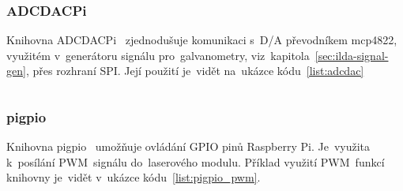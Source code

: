 \subsubsection{ADCDACPi}
Knihovna ADCDACPi~\cite{ADCDACPi} zjednodušuje komunikaci  s~D/A převodníkem mcp4822, využitém  v~generátoru signálu  pro~galvanometry,  viz~kapitola~\ref{sec:ilda-signal-gen}, přes rozhraní SPI. Její použití  je~vidět  na~ukázce kódu~\ref{list:adcdac}
\begin{code}
  \inputminted[frame=lines,fontsize=\footnotesize{}, linenos, breaklines]{cpp}{code_examples/adcdac.cpp}
\end{code}

\subsubsection{pigpio}\label{sec:ls_pigpio}
Knihovna pigpio~\cite{pigpio} umožňuje ovládání GPIO pinů Raspberry Pi. Je~využita  k~posílání  PWM~signálu do~laserového modulu. Příklad využití  PWM~funkcí knihovny  je~vidět  v~ukázce kódu~\ref{list:pigpio_pwm}.

\begin{code}
  \inputminted[frame=lines,fontsize=\footnotesize{}, linenos, breaklines]{cpp}{code_examples/pigpio_pwm.cpp}
\end{code}

